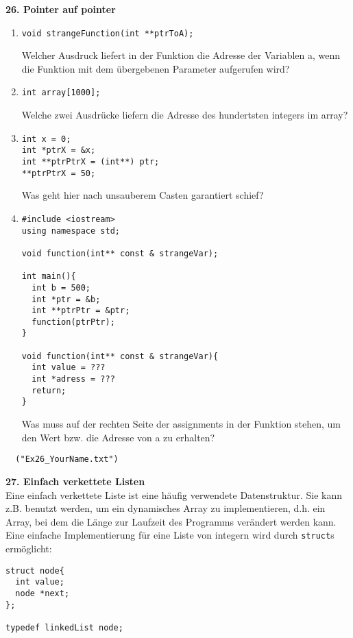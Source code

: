 \documentclass[paper=A4, pagesize, DIV=calc, smallheadings,
fontsize=11pt, expansion=false]{scrreprt}
\begin{document}
\textbf{26. Pointer auf pointer}\\
  \begin{enumerate}
  \item 
\begin{verbatim}
void strangeFunction(int **ptrToA);
\end{verbatim}
    Welcher Ausdruck liefert in der Funktion die Adresse der Variablen a, wenn die Funktion mit dem übergebenen Parameter aufgerufen wird?    
\item 
\begin{verbatim}
int array[1000];
\end{verbatim}
  Welche zwei Ausdrücke liefern die Adresse des hundertsten integers im array?
\item 
\begin{verbatim}
int x = 0;
int *ptrX = &x;
int **ptrPtrX = (int**) ptr;
**ptrPtrX = 50;
\end{verbatim}
Was geht hier nach unsauberem Casten garantiert schief?
\item 
\begin{verbatim}
#include <iostream>
using namespace std;

void function(int** const & strangeVar);

int main(){
  int b = 500;
  int *ptr = &b;
  int **ptrPtr = &ptr;
  function(ptrPtr);
}

void function(int** const & strangeVar){
  int value = ???
  int *adress = ???  
  return;
}
\end{verbatim}
Was muss auf der rechten Seite der assignments in der Funktion stehen, um den Wert bzw. die Adresse von a zu erhalten?

\end{enumerate}
\begin{verbatim}
  ("Ex26_YourName.txt")
\end{verbatim}


\textbf{27. Einfach verkettete Listen}\\
  Eine einfach verkettete Liste ist eine häufig verwendete Datenstruktur. Sie kann z.B. benutzt werden, um ein dynamisches Array zu implementieren, d.h. ein Array, bei dem die Länge zur Laufzeit des Programms verändert werden kann. Eine einfache Implementierung für eine Liste von integern wird durch \texttt{struct}s ermöglicht:

\begin{verbatim}
struct node{
  int value;
  node *next;
};

typedef linkedList node;
\end{verbatim}
\end{document}
